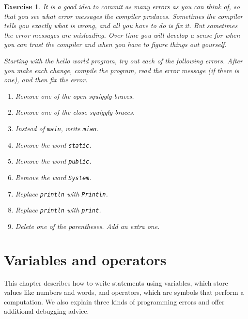 \documentclass[12pt]{book}
\theoremstyle{exercise}
\newtheorem{exercise}{Exercise}[chapter]
\newcommand{\java}[1]{\verb"#1"}
\begin{document}
\begin{exercise}

It is a good idea to commit as many errors as you can think of, so that you see what error messages the compiler produces.
Sometimes the compiler tells you exactly what is wrong, and all you have to do is fix it.
But sometimes the error messages are misleading.
Over time you will develop a sense for when you can trust the compiler and when you have to figure things out yourself.

Starting with the hello world program, try out each of the following errors.
After you make each change, compile the program, read the error message (if there is one), and then fix the error.

\begin{enumerate}
\item Remove one of the open squiggly-braces.
\item Remove one of the close squiggly-braces.
\item Instead of \java{main}, write \java{mian}.
\item Remove the word \java{static}.
\item Remove the word \java{public}.
\item Remove the word \java{System}.
\item Replace \java{println} with \java{Println}.
\item Replace \java{println} with \java{print}.
\item Delete one of the parentheses.
Add an extra one.
\end{enumerate}


\end{exercise}


\chapter{Variables and operators}

This chapter describes how to write statements using variables, which store values like numbers and words, and operators, which are symbols that perform a computation.
We also explain three kinds of programming errors and offer additional debugging advice.
\end{document}
